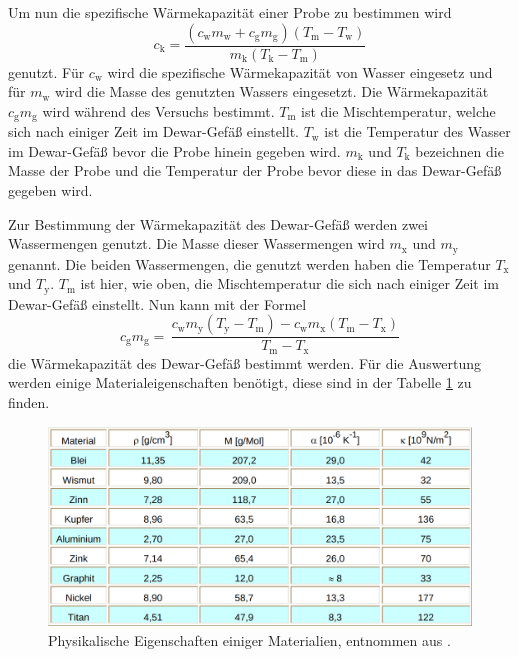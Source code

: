 Um nun die spezifische Wärmekapazität einer Probe zu bestimmen wird
\begin{equation}
   c_\text{k} = \frac{(c_\text{w}m_\text{w} + c_\text{g}m_\text{g})(T_\text{m}-T_\text{w})}{m_\text{k}(T_\text{k}-T_\text{m})} 
   \label{eqn:kapa}
\end{equation}
genutzt.
Für $c_\text{w}$ wird die spezifische Wärmekapazität von Wasser eingesetz und für $m_\text{w}$ wird die Masse des genutzten Wassers eingesetzt.
Die Wärmekapazität $c_\text{g}m_\text{g}$ wird während des Versuchs bestimmt.
$T_\text{m}$ ist die Mischtemperatur, welche sich nach einiger Zeit im Dewar-Gefäß einstellt.
$T_\text{w}$ ist die Temperatur des Wasser im Dewar-Gefäß bevor die Probe hinein gegeben wird.
$m_\text{k}$ und $T_\text{k}$ bezeichnen die Masse der Probe und die Temperatur der Probe bevor diese in das Dewar-Gefäß gegeben wird.

Zur Bestimmung der Wärmekapazität des Dewar-Gefäß werden zwei Wassermengen genutzt.
Die Masse dieser Wassermengen wird $m_\text{x}$ und $m_\text{y}$ genannt.
Die beiden Wassermengen, die genutzt werden haben die Temperatur $T_\text{x}$ und $T_\text{y}$.
$T_\text{m}$ ist hier, wie oben, die Mischtemperatur die sich nach einiger Zeit im Dewar-Gefäß einstellt.
Nun kann mit der Formel
\begin{equation}
    c_\text{g} m_\text{g} = \, \frac{c_\text{w}m_\text{y}(T_\text{y}-T_\text{m})-c_\text{w}m_\text{x}(T_\text{m}-T_\text{x})}{T_\text{m}-T_\text{x}}
    \label{eqn:dewar}
\end{equation}
die Wärmekapazität des Dewar-Gefäß bestimmt werden.
Für die Auswertung werden einige Materialeigenschaften benötigt, diese sind in der Tabelle \ref{fig:material} zu finden.
\begin{figure}
    \centering
    \includegraphics[width=\textwidth]{content/data/tabelleV201.png}
    \caption{Physikalische Eigenschaften einiger Materialien, entnommen aus \cite{anleitung}.}
    \label{fig:material}
\end{figure}